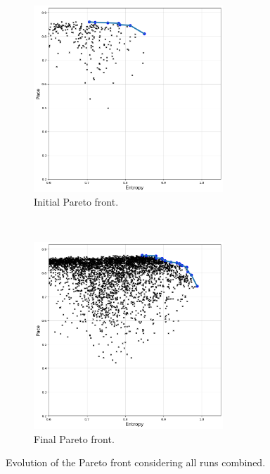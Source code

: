 \begin{figure}[hbtp]
    \centering
    \begin{subfigure}[t]{0.5\textwidth}
        \centering
        \includegraphics[height=7cm]{Images/images/experiment_two/Pareto/pareto_front_total_begin.png}
        \caption{Initial Pareto front.}
    \end{subfigure}%
    ~ 
    \begin{subfigure}[t]{0.5\textwidth}
        \centering
        \includegraphics[height=7cm]{Images/images/experiment_two/Pareto/pareto_front_total_final.png}
        \caption{Final Pareto front.}
        \label{fig:ex_two_pareto_front_total}
    \end{subfigure}
    \caption{Evolution of the Pareto front considering all runs combined.}
    \label{fig:ex_two_pareto_evolution}
\end{figure}


